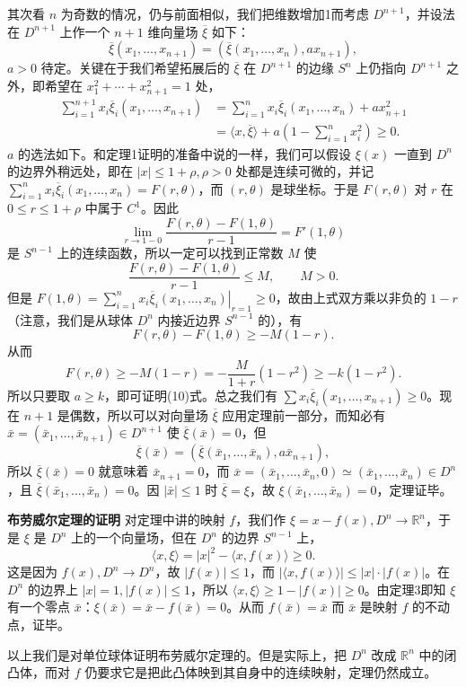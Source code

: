 其次看 $n$ 为奇数的情况，仍与前面相似，我们把维数增加1而考虑 $D^{n+1}$，并设法在 $D^{n+1}$ 上作一个 $n+1$ 维向量场 $\overline\xi$ 如下：
\begin{equation}
 \overline\xi(x_1,\ldots,x_{n+1})=(\overline\xi(x_1,\ldots,x_n),a x_{n+1}),
 \tag{9}
\end{equation}
$a>0$ 待定。关键在于我们希望拓展后的 $\overline\xi$ 在 $D^{n+1}$ 的边缘 $S^n$ 上仍指向 $D^{n+1}$ 之外，即希望在 $x_1^2+\cdots+x_{n+1}^2=1$ 处，
\begin{equation}
\begin{aligned}
 \sum_{i=1}^{n+1}x_i\overline\xi_i(x_1,\ldots,x_{n+1})
 &=\sum_{i=1}^{n}x_i\overline\xi_i(x_1,\ldots,x_n)+a x_{n+1}^2\\
 &=\langle x,\overline\xi\rangle+a\left(1-\sum_{i=1}^{n}x_i^2\right)\ge0.
\end{aligned}
 \tag{10}
\end{equation}
$a$ 的选法如下。和定理1证明的准备中说的一样，我们可以假设 $\xi(x)$ 一直到 $D^n$ 的边界外稍远处，即在 $|x|\le1+\rho,\rho>0$ 处都是连续可微的，并记 $\sum_{i=1}^n x_i\overline\xi_i(x_1,\ldots,x_n)=F(r,\theta)$，而 $(r,\theta)$ 是球坐标。于是 $F(r,\theta)$ 对 $r$ 在 $0\le r\le1+\rho$ 中属于 $C^1$。因此
\[
 \lim_{r\to1-0}\frac{F(r,\theta)-F(1,\theta)}{r-1}=F'(1,\theta)
\]
是 $S^{n-1}$ 上的连续函数，所以一定可以找到正常数 $M$ 使
\[
 \frac{F(r,\theta)-F(1,\theta)}{r-1}\le M,\qquad M>0.
\]
但是 $F(1,\theta)=\left.\sum_{i=1}^n x_i\overline\xi_i(x_1,\ldots,x_n)\right|_{r=1}\ge0$，故由上式双方乘以非负的 $1-r$（注意，我们是从球体 $D^n$ 内接近边界 $S^{n-1}$ 的），有
\[
 F(r,\theta)-F(1,\theta)\ge-M(1-r).
\]
从而
\[
 F(r,\theta)\ge-M(1-r)= -\frac{M}{1+r}(1-r^2)\ge-k(1-r^2).
\]
所以只要取 $a\ge k$，即可证明(10)式。总之我们有 $\sum x_i\overline\xi_i(x_1,\ldots,x_{n+1})\ge0$。现在 $n+1$ 是偶数，所以可以对向量场 $\overline\xi$ 应用定理前一部分，而知必有 $\bar x=(\bar x_1,\ldots,\bar x_{n+1})\in D^{n+1}$ 使 $\overline\xi(\bar x)=0$，但
\[
 \overline\xi(\bar x)=(\overline\xi(\bar x_1,\ldots,\bar x_n),a\bar x_{n+1}),
\]
所以 $\overline\xi(\bar x)=0$ 就意味着 $\bar x_{n+1}=0$，而 $\bar x=(\bar x_1,\ldots,\bar x_n,0)\simeq(\bar x_1,\ldots,\bar x_n)\in D^n$，且 $\overline\xi(\bar x_1,\ldots,\bar x_n)=0$。因 $|\bar x|\le1$ 时 $\overline\xi=\xi$，故 $\xi(\bar x_1,\ldots,\bar x_n)=0$，定理证毕。

\noindent\textbf{布劳威尔定理的证明}\quad
对定理中讲的映射 $f$，我们作 $\xi=x-f(x),D^n\to\mathbb R^n$，于是 $\xi$ 是 $D^n$ 上的一个向量场，但在 $D^n$ 的边界 $S^{n-1}$ 上，
\[
 \langle x,\xi\rangle=|x|^2-\langle x,f(x)\rangle\ge0.
\]
这是因为 $f(x),D^n\to D^n$，故 $|f(x)|\le1$，而 $|\langle x,f(x)\rangle|\le|x|\cdot|f(x)|$。在 $D^n$ 的边界上 $|x|=1,|f(x)|\le1$，所以 $\langle x,\xi\rangle\ge1-|f(x)|\ge0$。由定理3即知 $\xi$ 有一个零点 $\bar x$：$\xi(\bar x)=\bar x-f(\bar x)=0$。从而 $f(\bar x)=\bar x$ 而 $\bar x$ 是映射 $f$ 的不动点，证毕。

以上我们是对单位球体证明布劳威尔定理的。但是实际上，把 $D^n$ 改成 $\mathbb R^n$ 中的闭凸体，而对 $f$ 仍要求它是把此凸体映到其自身中的连续映射，定理仍然成立。
